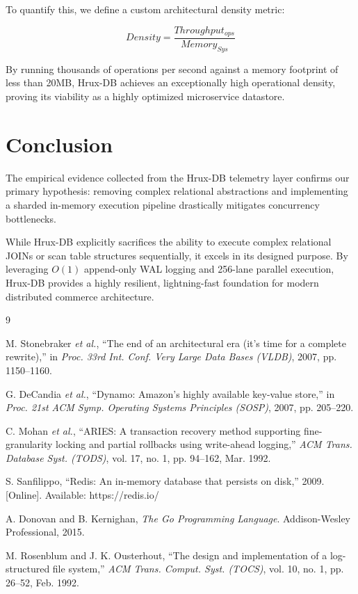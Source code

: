 \documentclass[10pt,twocolumn,letterpaper]{article}
\begin{document}
To quantify this, we define a custom architectural density metric:

\begin{equation}
Density = \frac{Throughput_{ops}}{Memory_{Sys}}
\end{equation}

By running thousands of operations per second against a memory footprint of less than 20MB, Hrux-DB achieves an exceptionally high operational density, proving its viability as a highly optimized microservice datastore.

\section{Conclusion}

The empirical evidence collected from the Hrux-DB telemetry layer confirms our primary hypothesis: removing complex relational abstractions and implementing a sharded in-memory execution pipeline drastically mitigates concurrency bottlenecks. 

While Hrux-DB explicitly sacrifices the ability to execute complex relational JOINs or scan table structures sequentially, it excels in its designed purpose. By leveraging $O(1)$ append-only WAL logging and 256-lane parallel execution, Hrux-DB provides a highly resilient, lightning-fast foundation for modern distributed commerce architecture. 

\begin{thebibliography}{9}

M. Stonebraker \textit{et al.}, 
``The end of an architectural era (it's time for a complete rewrite),'' 
in \textit{Proc. 33rd Int. Conf. Very Large Data Bases (VLDB)}, 2007, pp. 1150--1160.

G. DeCandia \textit{et al.}, 
``Dynamo: Amazon's highly available key-value store,'' 
in \textit{Proc. 21st ACM Symp. Operating Systems Principles (SOSP)}, 2007, pp. 205--220.

C. Mohan \textit{et al.}, 
``ARIES: A transaction recovery method supporting fine-granularity locking and partial rollbacks using write-ahead logging,'' 
\textit{ACM Trans. Database Syst. (TODS)}, vol. 17, no. 1, pp. 94--162, Mar. 1992.

S. Sanfilippo, 
``Redis: An in-memory database that persists on disk,'' 
2009. [Online]. Available: https://redis.io/

A. Donovan and B. Kernighan, 
\textit{The Go Programming Language}. 
Addison-Wesley Professional, 2015.

M. Rosenblum and J. K. Ousterhout,
``The design and implementation of a log-structured file system,''
\textit{ACM Trans. Comput. Syst. (TOCS)}, vol. 10, no. 1, pp. 26--52, Feb. 1992.

\end{thebibliography}
\end{document}
